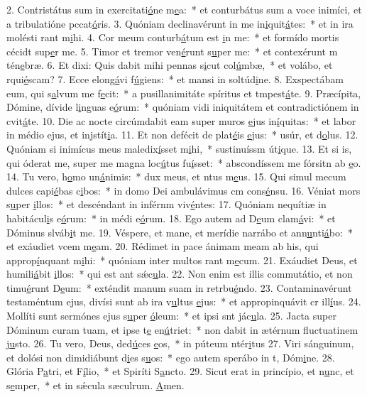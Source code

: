 2. Contristátus sum in exercitati\uline{ó}ne m\uline{e}a:~* et conturbátus sum a voce inimíci, et a tribulatióne pccat\uline{ó}ris.
3. Quóniam declinavérunt in me in\uline{i}quit\uline{á}tes:~* et in ira molésti rant m\uline{i}hi.
4. Cor meum conturb\uline{á}tum est \uline{i}n me:~* et formído mortis cécidt sup\uline{e}r me.
5. Timor et tremor ven\uline{é}runt s\uline{u}per me:~* et contexérunt m tén\uline{e}bræ.
6. Et dixi: Quis dabit mihi pennas s\uline{i}cut col\uline{ú}mbæ,~* et volábo, et rqui\uline{é}scam?
7. Ecce elong\uline{á}vi f\uline{ú}giens:~* et mansi in soltúd\uline{i}ne.
8. Exspectábam eum, qui s\uline{a}lvum me f\uline{e}cit:~* a pusillanimitáte spíritus et tmpest\uline{á}te.
9. Præcípita, Dómine, dívide l\uline{i}nguas e\uline{ó}rum:~* quóniam vidi iniquitátem et contradictiónem in cvit\uline{á}te.
10. Die ac nocte circúmdabit eam super muros \uline{e}jus in\uline{í}quitas:~* et labor in médio ejus, et injstít\uline{i}a.
11. Et non defécit de plat\uline{é}is \uline{e}jus:~* usúr, et d\uline{o}lus.
12. Quóniam si inimícus meus maledix\uline{í}sset m\uline{i}hi,~* sustinuíssm út\uline{i}que.
13. Et si is, qui óderat me, super me magna loc\uline{ú}tus fu\uline{í}sset:~* abscondíssem me fórsitn ab \uline{e}o.
14. Tu vero, h\uline{o}mo un\uline{á}nimis:~* dux meus, et ntus m\uline{e}us.
15. Qui simul mecum dulces capi\uline{é}bas c\uline{i}bos:~* in domo Dei ambulávimus cm cons\uline{é}nsu.
16. Véniat mors s\uline{u}per \uline{i}llos:~* et descéndant in inférnm viv\uline{é}ntes:
17. Quóniam nequítiæ in habitácul\uline{i}s e\uline{ó}rum:~* in médi e\uline{ó}rum.
18. Ego autem ad D\uline{e}um clam\uline{á}vi:~* et Dóminus slváb\uline{i}t me.
19. Véspere, et mane, et merídie narrábo et ann\uline{u}nti\uline{á}bo:~* et exáudiet vcem m\uline{e}am.
20. Rédimet in pace ánimam meam ab his, qui approp\uline{í}nquant m\uline{i}hi:~* quóniam inter multos rant m\uline{e}cum.
21. Exáudiet Deus, et humili\uline{á}bit \uline{i}llos:~* qui est ant sǽc\uline{u}la.
22. Non enim est illis commutátio, et non timu\uline{é}runt D\uline{e}um:~* exténdit manum suam in retrbu\uline{é}ndo.
23. Contaminavérunt testaméntum ejus, divísi sunt ab ira v\uline{u}ltus \uline{e}jus:~* et appropinquávit cr ill\uline{í}us.
24. Mollíti sunt sermónes ejus s\uline{u}per \uline{ó}leum:~* et ipsi snt jác\uline{u}la.
25. Jacta super Dóminum curam tuam, et ipse t\uline{e} en\uline{ú}triet:~* non dabit in ætérnum fluctuatinem j\uline{u}sto.
26. Tu vero, Deus, ded\uline{ú}ces \uline{e}os,~* in púteum ntér\uline{i}tus
27. Viri sánguinum, et dolósi non dimidiábunt d\uline{i}es s\uline{u}os:~* ego autem sperábo in t, Dóm\uline{i}ne.
28. Glória P\uline{a}tri, et F\uline{í}lio,~* et Spiríti S\uline{a}ncto.
29. Sicut erat in princípio, et n\uline{u}nc, et s\uline{e}mper,~* et in sǽcula sæculrum. \uline{A}men.

